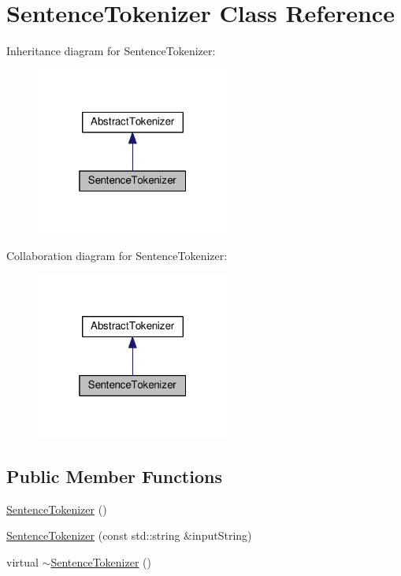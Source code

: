 \hypertarget{classSentenceTokenizer}{}\section{Sentence\+Tokenizer Class Reference}
\label{classSentenceTokenizer}


Inheritance diagram for Sentence\+Tokenizer\+:\nopagebreak
\begin{figure}[H]
\begin{center}
\leavevmode
\includegraphics[width=181pt]{classSentenceTokenizer__inherit__graph}
\end{center}
\end{figure}


Collaboration diagram for Sentence\+Tokenizer\+:\nopagebreak
\begin{figure}[H]
\begin{center}
\leavevmode
\includegraphics[width=181pt]{classSentenceTokenizer__coll__graph}
\end{center}
\end{figure}
\subsection*{Public Member Functions}
\begin{DoxyCompactItemize}
\item 
\hyperlink{classSentenceTokenizer_a7ac4c0f31e4066808cb2f4e8f1aee545}{Sentence\+Tokenizer} ()
\item 
\hyperlink{classSentenceTokenizer_a3ac263cb539f5dd072931a4d9f134d74}{Sentence\+Tokenizer} (const std\+::string \&input\+String)
\item 
virtual \hyperlink{classSentenceTokenizer_a91bcdff9ff84fce9c56208c19254bdba}{$\sim$\+Sentence\+Tokenizer} ()
\end{DoxyCompactItemize}
